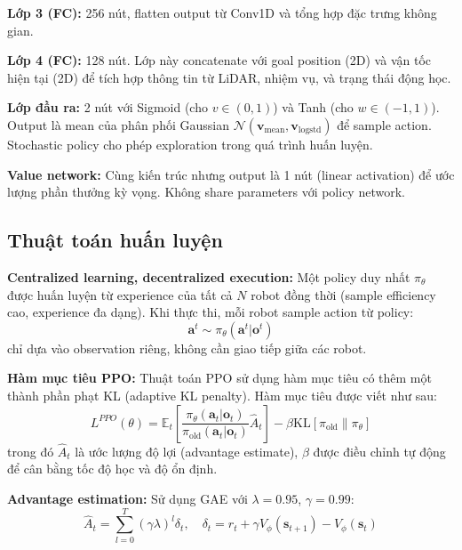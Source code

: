 \textbf{Lớp 3 (FC):} 256 nút, flatten output từ Conv1D và tổng hợp đặc trưng không gian.

\textbf{Lớp 4 (FC):} 128 nút. Lớp này concatenate với goal position (2D) và vận tốc hiện tại (2D) để tích hợp thông tin từ LiDAR, nhiệm vụ, và trạng thái động học.

\textbf{Lớp đầu ra:} 2 nút với Sigmoid (cho $v \in (0,1)$) và Tanh (cho $w \in (-1,1)$). Output là mean của phân phối Gaussian $\mathcal{N}(\mathbf{v}_{\text{mean}}, \mathbf{v}_{\text{logstd}})$ để sample action. Stochastic policy cho phép exploration trong quá trình huấn luyện.

\textbf{Value network:} Cùng kiến trúc nhưng output là 1 nút (linear activation) để ước lượng phần thưởng kỳ vọng. Không share parameters với policy network.

\subsection{Thuật toán huấn luyện}
\label{subsec:long_ppo}

\textbf{Centralized learning, decentralized execution:} Một policy duy nhất $\pi_\theta$ được huấn luyện từ experience của tất cả $N$ robot đồng thời (sample efficiency cao, experience đa dạng). Khi thực thi, mỗi robot sample action từ policy:
\begin{equation}
\mathbf{a}^t \sim \pi_\theta(\mathbf{a}^t | \mathbf{o}^t)
\end{equation}
chỉ dựa vào observation riêng, không cần giao tiếp giữa các robot.

\textbf{Hàm mục tiêu PPO:} Thuật toán PPO sử dụng hàm mục tiêu có thêm một thành phần phạt KL (adaptive KL penalty). Hàm mục tiêu được viết như sau:
\begin{equation}
L^{PPO}(\theta) = \mathbb{E}_t \left[ \frac{\pi_\theta(\mathbf{a}_t | \mathbf{o}_t)}{\pi_{\text{old}}(\mathbf{a}_t | \mathbf{o}_t)} \hat{A}_t \right] - \beta \text{KL}[\pi_{\text{old}} \| \pi_\theta]
\end{equation}
trong đó $\hat{A}_t$ là ước lượng độ lợi (advantage estimate), $\beta$ được điều chỉnh tự động để cân bằng tốc độ học và độ ổn định.

\textbf{Advantage estimation:} Sử dụng GAE với $\lambda = 0.95$, $\gamma = 0.99$:
\begin{equation}
\hat{A}_t = \sum_{l=0}^{T} (\gamma \lambda)^l \delta_t, \quad \delta_t = r_t + \gamma V_\phi(\mathbf{s}_{t+1}) - V_\phi(\mathbf{s}_t)
\end{equation}


